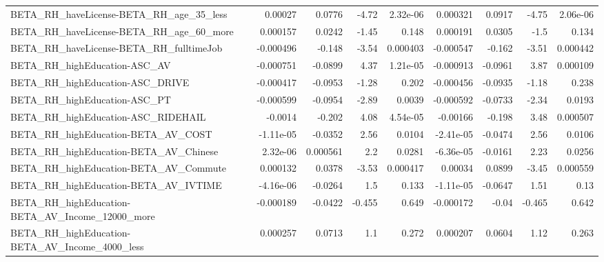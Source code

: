 \begin{tabular}{lrrrrrrrr}
BETA\_RH\_haveLicense-BETA\_RH\_age\_35\_less            &     0.00027 &       0.0776 &    -4.72 & 2.32e-06 &   0.000321 &      0.0917 &        -4.75 &      2.06e-06 \\
BETA\_RH\_haveLicense-BETA\_RH\_age\_60\_more            &    0.000157 &       0.0242 &    -1.45 &    0.148 &   0.000191 &      0.0305 &         -1.5 &         0.134 \\
BETA\_RH\_haveLicense-BETA\_RH\_fulltimeJob            &   -0.000496 &       -0.148 &    -3.54 & 0.000403 &  -0.000547 &      -0.162 &        -3.51 &      0.000442 \\
BETA\_RH\_highEducation-ASC\_AV                       &   -0.000751 &      -0.0899 &     4.37 & 1.21e-05 &  -0.000913 &     -0.0961 &         3.87 &      0.000109 \\
BETA\_RH\_highEducation-ASC\_DRIVE                    &   -0.000417 &      -0.0953 &    -1.28 &    0.202 &  -0.000456 &     -0.0935 &        -1.18 &         0.238 \\
BETA\_RH\_highEducation-ASC\_PT                       &   -0.000599 &      -0.0954 &    -2.89 &   0.0039 &  -0.000592 &     -0.0733 &        -2.34 &        0.0193 \\
BETA\_RH\_highEducation-ASC\_RIDEHAIL                 &     -0.0014 &       -0.202 &     4.08 & 4.54e-05 &   -0.00166 &      -0.198 &         3.48 &      0.000507 \\
BETA\_RH\_highEducation-BETA\_AV\_COST                 &   -1.11e-05 &      -0.0352 &     2.56 &   0.0104 &  -2.41e-05 &     -0.0474 &         2.56 &        0.0106 \\
BETA\_RH\_highEducation-BETA\_AV\_Chinese              &    2.32e-06 &     0.000561 &      2.2 &   0.0281 &  -6.36e-05 &     -0.0161 &         2.23 &        0.0256 \\
BETA\_RH\_highEducation-BETA\_AV\_Commute              &    0.000132 &       0.0378 &    -3.53 & 0.000417 &    0.00034 &      0.0899 &        -3.45 &      0.000559 \\
BETA\_RH\_highEducation-BETA\_AV\_IVTIME               &   -4.16e-06 &      -0.0264 &      1.5 &    0.133 &  -1.11e-05 &     -0.0647 &         1.51 &          0.13 \\
BETA\_RH\_highEducation-BETA\_AV\_Income\_12000\_more    &   -0.000189 &      -0.0422 &   -0.455 &    0.649 &  -0.000172 &       -0.04 &       -0.465 &         0.642 \\
BETA\_RH\_highEducation-BETA\_AV\_Income\_4000\_less     &    0.000257 &       0.0713 &      1.1 &    0.272 &   0.000207 &      0.0604 &         1.12 &         0.263 \\

\end{tabular}
